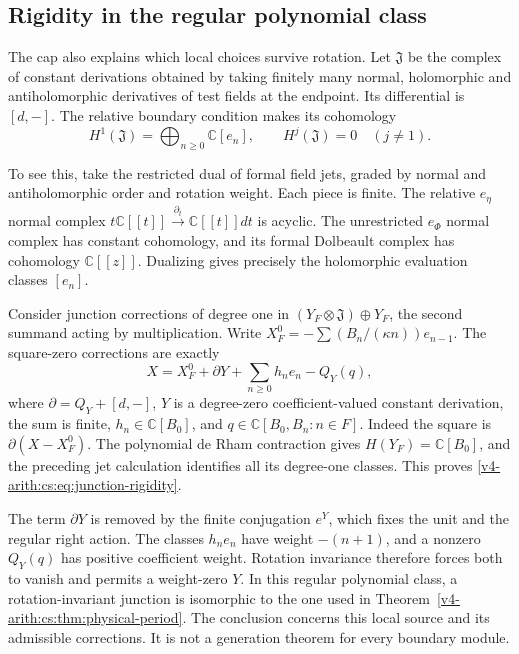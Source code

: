 \subsection{Rigidity in the regular polynomial class}

The cap also explains which local choices survive rotation. Let \(\mathfrak
J\) be the complex of constant derivations obtained by taking finitely many
normal, holomorphic and antiholomorphic derivatives of test fields at the
endpoint. Its differential is \([d,-]\). The relative boundary condition
makes its cohomology
\[
 H^1(\mathfrak J)=\bigoplus_{n\ge0}\mathbb C[e_n],
 \qquad H^j(\mathfrak J)=0\quad(j\ne1).
\]

To see this, take the restricted dual of formal field jets, graded by normal
and antiholomorphic order and rotation weight. Each piece is finite. The
relative \(e_\eta\) normal complex \(t\mathbb C[[t]]\xrightarrow{\partial_t}
\mathbb C[[t]]dt\) is acyclic. The unrestricted \(e_\Phi\) normal complex
has constant cohomology, and its formal Dolbeault complex has cohomology
\(\mathbb C[[z]]\). Dualizing gives precisely the holomorphic evaluation
classes \([e_n]\).

Consider junction corrections of degree one in \((Y_F\otimes\mathfrak
J)\oplus Y_F\), the second summand acting by multiplication. Write
\(X_F^0=-\sum(B_n/(\kappa n))e_{n-1}\). The square-zero corrections are
exactly
\begin{equation}
 X=X_F^0+\partial Y+\sum_{n\ge0}h_ne_n-Q_Y(q),
 \label{v4-arith:cs:eq:junction-rigidity}
\end{equation}
where \(\partial=Q_Y+[d,-]\), \(Y\) is a degree-zero coefficient-valued
constant derivation, the sum is finite, \(h_n\in\mathbb C[B_0]\), and
\(q\in\mathbb C[B_0,B_n:n\in F]\). Indeed the square is
\(\partial(X-X_F^0)\). The polynomial de Rham contraction gives
\(H(Y_F)=\mathbb C[B_0]\), and the preceding jet calculation identifies all
its degree-one classes. This proves
\eqref{v4-arith:cs:eq:junction-rigidity}.

The term \(\partial Y\) is removed by the finite conjugation \(e^Y\), which
fixes the unit and the regular right action. The classes \(h_ne_n\) have
weight \(-(n+1)\), and a nonzero \(Q_Y(q)\) has positive coefficient weight.
Rotation invariance therefore forces both to vanish and permits a
weight-zero \(Y\). In this regular polynomial class, a rotation-invariant
junction is isomorphic to the one used in
Theorem~\ref{v4-arith:cs:thm:physical-period}. The conclusion concerns this
local source and its admissible corrections. It is not a generation theorem
for every boundary module.

